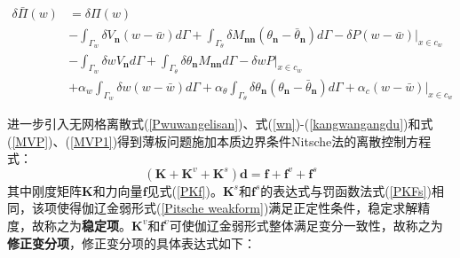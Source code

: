 \begin{equation}\label{Pitsche weakform}
\begin{split}
    \delta\bar{\Pi}(w)&=\delta\Pi(w)\\
 &-\int_{\Gamma_w}\delta V_{\pmb n}(w-\bar{w})d\Gamma+\int_{\Gamma_{\theta}}\delta M_{\pmb{nn}}(\theta_{\pmb n}-\bar{\theta}_{\pmb n})d\Gamma-\delta P(w-\bar{w})\vert_{x\in c_w}\\
 &-\int_{\Gamma_w}\delta wV_{\pmb n}d\Gamma+\int_{\Gamma_{\theta}}\delta\theta_{\pmb n}M_{\pmb{nn}}d\Gamma-\delta wP\vert_{x\in c_w}\\
 &+\alpha_w\int_{\Gamma_w}\delta w(w-\bar{w})d\Gamma+\alpha_\theta\int_{\Gamma_{\theta}}\delta\theta_{\pmb n}(\theta_{\pmb n}-\bar{\theta}_{\pmb n})d\Gamma+\alpha_c(w-\bar{w})\vert_{x\in c_w}
\end{split}
\end{equation}\par
进一步引入无网格离散式(\ref{Pwuwangelisan})、式(\ref{wn})-(\ref{kangwangangdu})和式(\ref{MVP})、(\ref{MVP1})得到薄板问题施加本质边界条件Nitsche法的离散控制方程式：
\begin{equation}
    (\pmb{K}+\pmb{K}^v+\pmb{K}^s)\pmb{d}=\pmb{f}+\pmb{f}^v+\pmb{f}^s
\end{equation}
其中刚度矩阵$\pmb{K}$和力向量$\pmb{f}$见式(\ref{PKf})。$\pmb{K}^s$和$\pmb{f}^s$的表达式与罚函数法式(\ref{PKFs})相同，该项使得伽辽金弱形式(\ref{Pitsche weakform})满足正定性条件，稳定求解精度，故称之为\textbf{稳定项}。$\pmb{K}^v$和$\pmb{f}^v$可使伽辽金弱形式整体满足变分一致性，故称之为\textbf{修正变分项}，修正变分项的具体表达式如下：
